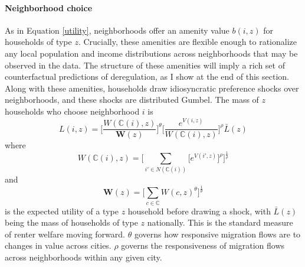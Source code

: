 \documentclass[12pt]{article}
\begin{document}
	\paragraph*{Neighborhood choice} 
	As in Equation \eqref{utility}, neighborhoods offer an amenity value $b(i, z)$ for households of type $z$. Crucially, these amenities are flexible enough to rationalize any local population and income distributions across neighborhoods that may be observed in the data. The structure of these amenities will imply a rich set of counterfactual predictions of deregulation, as I show at the end of this section. Along with these amenities, households draw idiosyncratic preference shocks over neighborhoods, and these shocks are distributed Gumbel. The mass of $z$ households who choose neighborhood $i$ is 
	\begin{equation}\label{laboursupply}
	L(i, z) = \bigg[\frac{W(\mathbb{C}(i), z)}{\boldsymbol{W}(z)}\bigg]^{\theta}\bigg[\frac{e^{V(i, z)}}{W(\mathbb{C}(i), z)}\bigg]^{\rho}\bar{L}(z)
	\end{equation}
	where
	\begin{equation*}
	W(\mathbb{C}(i), z) = \bigg[\sum_{i' \in N(\mathbb{C}(i))}\big[e^{V(i', z)}\big]^{\rho}\bigg]^{\frac{1}{\rho}}
	\end{equation*} 
	and 
	\begin{equation}\label{Welfare}
		\boldsymbol{W}(z) = \bigg[\sum_{c \in \mathbb{C}} W(c, z)^{\theta}\bigg]^{\frac{1}{\theta}}	
	\end{equation}
	is the expected utility of a type $z$ household before drawing a shock, with $\bar{L}(z)$ being the mass of households of type $z$ nationally.  This is the standard measure of renter welfare moving forward. $\theta$ governs how responsive migration flows are to changes in value across cities. $\rho$ governs the responsiveness of migration flows across neighborhoods within any given city. 
 
\end{document}
